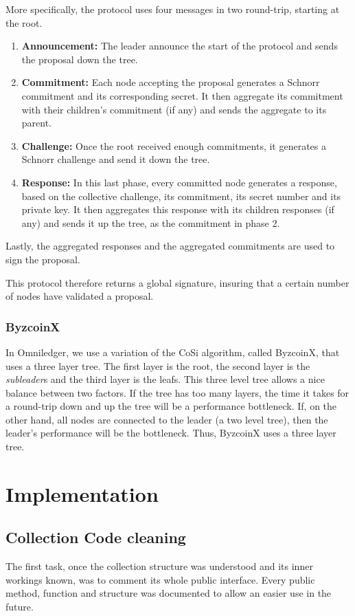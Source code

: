 \documentclass[11pt, a4paper, twoside, openright]{article}
\begin{document}
More specifically, the protocol uses four messages in two round-trip, starting at the root.
\begin{enumerate} 
\itemsep0em
 \item \textbf{Announcement:} The leader announce the start of the protocol and sends the proposal down the tree.
\item \textbf{Commitment:} Each node accepting the proposal generates a Schnorr commitment and its corresponding secret. It then aggregate its commitment with their children's commitment (if any) and sends the aggregate to its parent.
\item \textbf{Challenge:} Once the root received enough commitments, it generates a Schnorr challenge and send it down the tree.
\item \textbf{Response:} In this last phase, every committed node generates a response, based on the collective challenge, its commitment, its secret number and its private key. It then aggregates this response with its children responses (if any) and sends it up the tree, as the commitment in phase 2.
\end{enumerate}
Lastly, the aggregated responses and the aggregated commitments are used to sign the proposal.

This protocol therefore returns a global signature, insuring that a certain number of nodes have validated a proposal.

\subsubsection{ByzcoinX}
\label{ByzcoinX}
In Omniledger, we use a variation of the CoSi algorithm, called ByzcoinX, that uses a three layer tree. The first layer is the root, the second layer is the \textit{subleader}s and the third layer is the leafs. This three level tree allows a nice balance between two factors. If the tree has too many layers, the time it takes for a round-trip down and up the tree will be a performance bottleneck. If, on the other hand, all nodes are connected to the leader (a two level tree), then the leader's performance will be the bottleneck. Thus, ByzcoinX uses a three layer tree.

\section{Implementation}
\subsection{Collection Code cleaning}
The first task, once the collection structure was understood and its inner workings known, was to comment its whole public interface. Every public method, function and structure was documented to allow an easier use in the future.
\end{document}
